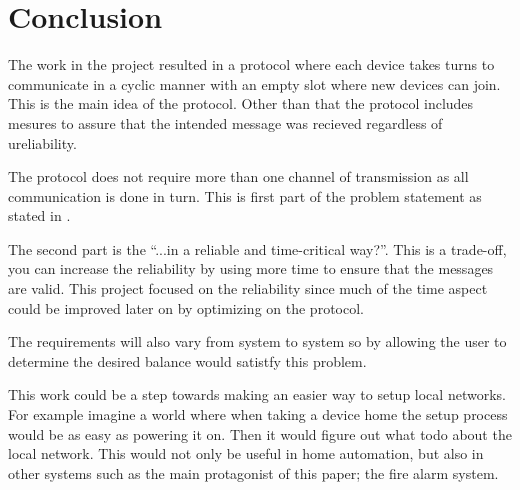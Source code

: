 \chapter{Conclusion}

The work in the project resulted in a protocol where each device takes turns to communicate in a cyclic manner with an empty slot where new devices can join.
This is the main idea of the protocol.
Other than that the protocol includes mesures to assure that the intended message was recieved regardless of ureliability.

The protocol does not require more than one channel of transmission as all communication is done in turn.
This is first part of the problem statement as stated in .

The second part is the \enquote{...in a reliable and time-critical way?}.
This is a trade-off, you can increase the reliability by using more time to ensure that the messages are valid.
This project focused on the reliability since much of the time aspect could be improved later on by optimizing on the protocol.

The requirements will also vary from system to system so by allowing the user to determine the desired balance would satistfy this problem.

This work could be a step towards making an easier way to setup local networks.
For example imagine a world where when taking a device home the setup process would be as easy as powering it on.
Then it would figure out what todo about the local network.
This would not only be useful in home automation, but also in other systems such as the main protagonist of this paper; the fire alarm system.
